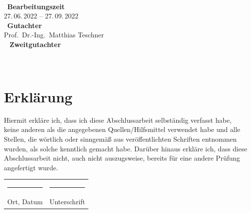 \documentclass[11pt,
a4paper,
parskip=half, %
BCOR=10mm, %
english,
ngerman]{scrreprt}
\newcommand{\firstexaminer}{Prof.~Dr.-Ing.~Matthias Teschner}
\newcommand{\advisers}{Prof.~Dr.-Ing.~Matthias Teschner}
\begin{document}
    \thispagestyle{empty}
    \ \vfill \ \\  %
    \
    \textbf{Bearbeitungszeit}            \smallskip{} \\
    27.\,06.\,2022 -- 27.\,09.\,2022   \bigskip{} \\
    \
    \textbf{Gutachter}                  \smallskip{} \\
    \firstexaminer                      \bigskip{} \\
    \
    \ifdef{\secondexaminer}
        {
        \textbf{Zweitgutachter}        \smallskip{} \\
        \secondexaminer                \bigskip{} \\
        \
        }
        {
        }



\chapter*{Erklärung}

Hiermit erkläre ich, dass ich diese Abschlussarbeit selbständig verfasst habe, keine anderen
als die angegebenen Quellen/Hilfsmittel verwendet habe und alle Stellen, die wörtlich oder
sinngemäß aus veröffentlichten Schriften entnommen wurden, als solche kenntlich gemacht
habe. Darüber hinaus erkläre ich, dass diese Abschlussarbeit nicht, auch nicht
auszugsweise, bereits für eine andere Prüfung angefertigt wurde.
\\[3\normalbaselineskip]
\begin{tabular}{p{0.5\textwidth} l}
  \rule{0.3\textwidth}{0.4pt}   &   \rule{0.4\textwidth}{0.4pt} \\
  Ort, Datum                  &   Unterschrift
\end{tabular}

\tableofcontents

\end{document}
